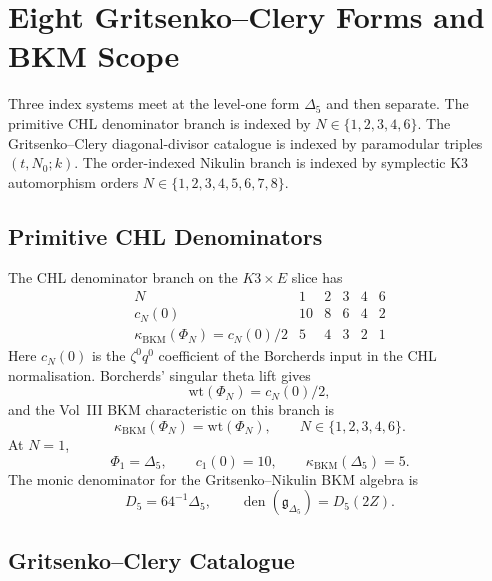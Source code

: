 \providecommand{\kBKM}{\kappa_{\mathrm{BKM}}}
\providecommand{\kch}{\kappa_{\mathrm{ch}}}
\providecommand{\kcat}{\kappa_{\mathrm{cat}}}
\providecommand{\kfib}{\kappa_{\mathrm{fiber}}}
\providecommand{\kHeis}{\kappa_{\mathrm{ch}}^{\mathrm{Heis}}}
\providecommand{\Mp}{\mathrm{Mp}}
\providecommand{\Sp}{\mathrm{Sp}}
\providecommand{\Z}{\mathbb{Z}}
\providecommand{\Q}{\mathbb{Q}}
\providecommand{\C}{\mathbb{C}}
\providecommand{\HH}{\mathbb{H}}
\providecommand{\wt}{\mathrm{wt}}
\providecommand{\Dfive}{D_5}
\providecommand{\CoHA}{\mathrm{CoHA}}

\section*{Eight Gritsenko--Clery Forms and BKM Scope}
\label{sec:eight-form-BKM-scope}

Three index systems meet at the level-one form $\Delta_5$ and then
separate. The primitive CHL denominator branch is indexed by
$N\in\{1,2,3,4,6\}$. The Gritsenko--Clery diagonal-divisor catalogue is
indexed by paramodular triples $(t,N_0;k)$. The order-indexed Nikulin
branch is indexed by symplectic K3 automorphism orders
$N\in\{1,2,3,4,5,6,7,8\}$.

\subsection*{Primitive CHL Denominators}

The CHL denominator branch on the $K3\times E$ slice has
\[
\begin{array}{c|ccccc}
N & 1 & 2 & 3 & 4 & 6 \\ \hline
c_N(0) & 10 & 8 & 6 & 4 & 2 \\
\kBKM(\Phi_N)=c_N(0)/2 & 5 & 4 & 3 & 2 & 1
\end{array}
\]
Here $c_N(0)$ is the $\zeta^0q^0$ coefficient of the Borcherds input in
the CHL normalisation. Borcherds' singular theta lift gives
\[
  \wt(\Phi_N)=c_N(0)/2,
\]
and the Vol~III BKM characteristic on this branch is
\[
  \kBKM(\Phi_N)=\wt(\Phi_N),\qquad N\in\{1,2,3,4,6\}.
\]
At $N=1$,
\[
  \Phi_1=\Delta_5,\qquad
  c_1(0)=10,\qquad
  \kBKM(\Delta_5)=5.
\]
The monic denominator for the Gritsenko--Nikulin BKM algebra is
\[
  \Dfive=64^{-1}\Delta_5,\qquad
  \operatorname{den}(\mathfrak g_{\Delta_5})=\Dfive(2Z).
\]

\subsection*{Gritsenko--Clery Catalogue}

